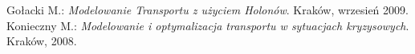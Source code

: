\begin{thebibliography}{2}
  Gołacki M.:
  \emph{Modelowanie Transportu z użyciem Holonów}. Kraków, wrzesień 2009.
  Konieczny M.:
  \emph{Modelowanie i optymalizacja transportu w sytuacjach kryzysowych}. Kraków, 2008.
  
\end{thebibliography}
